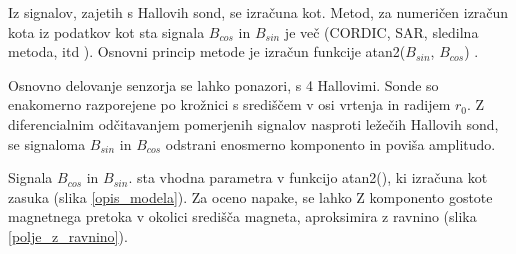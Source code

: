 Iz signalov, zajetih s Hallovih sond, se izračuna kot. Metod, za numeričen izračun kota iz podatkov kot sta signala $B_{cos}$ in $B_{sin}$ je več (CORDIC, SAR, sledilna metoda, itd \cite{ICHaus_interpolate}). Osnovni
princip metode je izračun funkcije atan2($B_{sin}$, $B_{cos}$) \cite{atan2Matlab}.

Osnovno delovanje senzorja se lahko ponazori, s 4 Hallovimi. Sonde so enakomerno razporejene po krožnici s središčem v osi vrtenja in radijem  $r_0$. Z diferencialnim odčitavanjem pomerjenih signalov nasproti ležečih Hallovih sond, se signaloma $B_{sin}$ in $B_{cos}$ odstrani enosmerno komponento in poviša amplitudo.

Signala $B_{cos}$ in $B_{sin}$. sta vhodna parametra v funkcijo atan2(), ki izračuna kot zasuka (slika \ref{opis_modela}).
Za oceno napake, se lahko Z komponento gostote magnetnega pretoka v okolici središča magneta, aproksimira z ravnino (slika \ref{polje_z_ravnino}).


